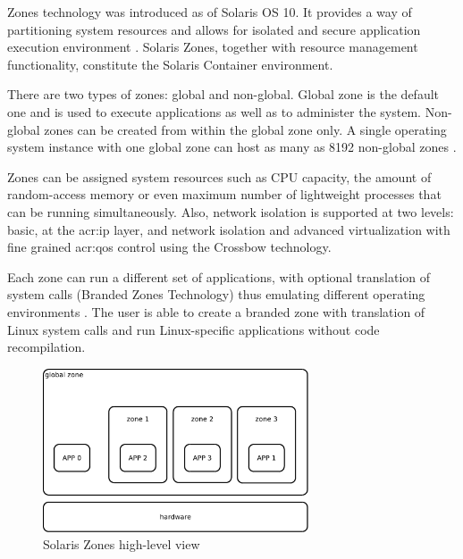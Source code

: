 \documentclass[11pt,openany]{book}
\begin{document}
        Zones technology was introduced as of Solaris OS 10. It provides a way of partitioning system resources and
        allows for isolated and secure application execution environment \cite{sag}. Solaris Zones, together with
        resource management functionality, constitute the Solaris Container environment.

        There are two types of zones: global and non-global. Global zone is the default one and is used to execute
        applications as well as to administer the system. Non-global zones can be created from within the global zone
        only. A single operating system instance with one global zone can host as many as 8192 non-global zones
        \cite{sag}.

        Zones can be assigned system resources such as CPU capacity, the amount of random-access memory or even maximum
        number of lightweight processes that can be running simultaneously. Also, network isolation is supported at two
        levels: basic, at the \gls{acr:ip} layer, and network isolation and advanced virtualization with fine grained
        \gls{acr:qos} control using the Crossbow technology.

        Each zone can run a different set of applications, with optional translation of system calls (Branded Zones
        Technology) thus emulating different operating environments \cite{sag}. The user is able to create a branded
        zone with translation of Linux system calls and run Linux-specific applications without code recompilation.

        \begin{figure}[H]
          \begin{center}
            \includegraphics[width=0.7\textwidth]{img/solaris/zones-high-level.pdf}
          \end{center}

          \caption{Solaris Zones high-level view}
        \end{figure}
\end{document}
